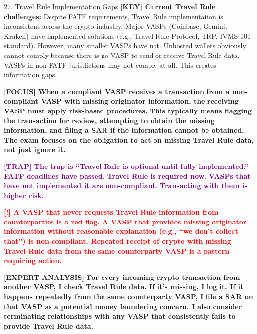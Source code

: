 \documentclass[11pt,a4paper]{beamer}
\newcommand{\redflag}[1]{\textcolor{red}{\textbf{[!] #1}}}
\newcommand{\examfocus}[1]{\textcolor{orange!80!black}{\textbf{[FOCUS] #1}}}
\newcommand{\trap}[1]{\textcolor{purple}{\textbf{[TRAP] #1}}}
\newcommand{\keyterm}[1]{\textcolor{red!80!black}{\textbf{[KEY] #1}}}
\newcommand{\expert}[1]{\textcolor{blue!70!black}{\textbf{[EXPERT ANALYSIS] #1}}}
\begin{document}
	\begin{frame}{27. Travel Rule Implementation Gaps}
		\tiny
		\keyterm{Current Travel Rule challenges:} Despite FATF requirements, Travel Rule implementation is inconsistent across the crypto industry. Major VASPs (Coinbase, Gemini, Kraken) have implemented solutions (e.g., Travel Rule Protocol, TRP, IVMS 101 standard). However, many smaller VASPs have not. Unhosted wallets obviously cannot comply because there is no VASP to send or receive Travel Rule data. VASPs in non-FATF jurisdictions may not comply at all. This creates information gaps.
		
		\vspace{0.1cm}
		\examfocus{When a compliant VASP receives a transaction from a non-compliant VASP with missing originator information, the receiving VASP must apply risk-based procedures. This typically means flagging the transaction for review, attempting to obtain the missing information, and filing a SAR if the information cannot be obtained. The exam focuses on the obligation to act on missing Travel Rule data, not just ignore it.}
		
		\vspace{0.1cm}
		\trap{The trap is “Travel Rule is optional until fully implemented.” FATF deadlines have passed. Travel Rule is required now. VASPs that have not implemented it are non-compliant. Transacting with them is higher risk.}
		
		\vspace{0.1cm}
		\redflag{A VASP that never requests Travel Rule information from counterparties is a red flag. A VASP that provides missing originator information without reasonable explanation (e.g., “we don't collect that”) is non-compliant. Repeated receipt of crypto with missing Travel Rule data from the same counterparty VASP is a pattern requiring action.}
		
		\vspace{0.1cm}
		\expert{For every incoming crypto transaction from another VASP, I check Travel Rule data. If it's missing, I log it. If it happens repeatedly from the same counterparty VASP, I file a SAR on that VASP as a potential money laundering concern. I also consider terminating relationships with any VASP that consistently fails to provide Travel Rule data.}
	\end{frame}
	
\end{document}
